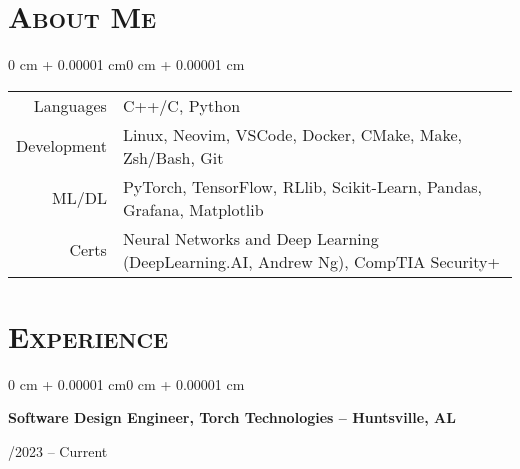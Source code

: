 \documentclass[10pt, letterpaper]{article}
\newenvironment{onecolentry}{
    \begin{adjustwidth}{0 cm + 0.00001 cm}{0 cm + 0.00001 cm}
}{
    \end{adjustwidth}
}
\newenvironment{twocolentry}[1]{
    \onecolentry
    \def\secondColumn{#1}
    \setcolumnwidth{\fill,4.5cm}
    \begin{paracol}{2}
}{
    \switchcolumn \raggedleft \secondColumn
    \end{paracol}
    \endonecolentry
}
\begin{document}
\section{\scshape About Me}

\begin{onecolentry}
\begin{tabular}{@{}r l@{}}
Languages & C++/C, Python \\
Development & Linux, Neovim, VSCode, Docker, CMake, Make, Zsh/Bash, Git \\
ML/DL & PyTorch, TensorFlow, RLlib, Scikit-Learn, Pandas, Grafana, Matplotlib \\
Certs & Neural Networks and Deep Learning (DeepLearning.AI, Andrew Ng), CompTIA Security+ \\
\end{tabular}
\end{onecolentry}


\section{\scshape Experience}

\begin{twocolentry}{05/2023 – Current}
    \textbf{Software Design Engineer, Torch Technologies – Huntsville, AL}
\end{twocolentry}
\end{document}
